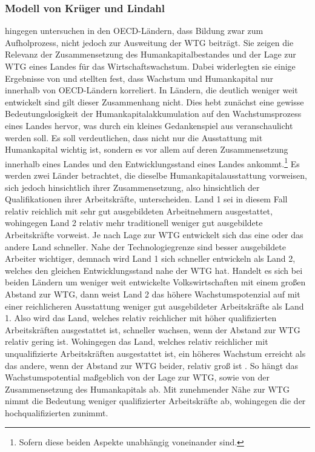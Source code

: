 \subsubsection*{Modell von Krüger und Lindahl}
\cite{Krueger.2001} hingegen untersuchen in den OECD-Ländern, dass Bildung zwar zum Aufholprozess, nicht jedoch zur Ausweitung der WTG beiträgt.
Sie zeigen die Relevanz der Zusammensetzung des Humankapitalbestandes und der Lage zur WTG eines Landes für das Wirtschaftswachstum. Dabei widerlegten sie einige Ergebnisse von \cite{Benhabib.1994} und stellten fest, dass Wachstum und Humankapital nur innerhalb von OECD-Ländern korreliert. In Ländern, die deutlich weniger weit entwickelt sind gilt dieser Zusammenhang nicht. Dies hebt zunächst eine gewisse Bedeutungslosigkeit der Humankapitalakkumulation auf den Wachstumsprozess eines Landes hervor, was durch ein kleines Gedankenspiel aus \cite{Krueger.2001} veranschaulicht werden soll. Es soll verdeutlichen, dass nicht nur die Ausstattung mit Humankapital wichtig ist, sondern es vor allem auf deren Zusammensetzung innerhalb eines Landes und den Entwicklungsstand eines Landes ankommt.\footnote{Sofern diese beiden Aspekte unabhängig voneinander sind.} Es werden zwei Länder betrachtet, die dieselbe Humankapitalausstattung vorweisen, sich jedoch hinsichtlich ihrer Zusammensetzung, also hinsichtlich der Qualifikationen ihrer Arbeitskräfte, unterscheiden. Land 1 sei in diesem Fall relativ reichlich mit sehr gut ausgebildeten Arbeitnehmern ausgestattet, wohingegen Land 2 relativ mehr traditionell weniger gut ausgebildete Arbeitskräfte vorweist. Je nach Lage zur WTG entwickelt sich das eine oder das andere Land schneller. Nahe der Technologiegrenze sind besser ausgebildete Arbeiter wichtiger, demnach wird Land 1 sich schneller entwickeln als Land 2, welches den gleichen Entwicklungsstand nahe der WTG hat. Handelt es sich bei beiden Ländern um weniger weit entwickelte Volkswirtschaften mit einem großen Abstand zur WTG, dann weist Land 2 das höhere Wachstumspotenzial auf mit einer reichlicheren Ausstattung weniger gut ausgebildeter Arbeitskräfte als Land 1. Also wird das Land, welches relativ reichlicher mit höher qualifizierten Arbeitskräften ausgestattet ist, schneller wachsen, wenn der Abstand zur WTG relativ gering ist. Wohingegen das Land, welches relativ reichlicher mit unqualifizierte Arbeitskräften ausgestattet ist, ein höheres Wachstum erreicht als das andere, wenn der Abstand zur WTG beider, relativ groß ist \cite{Krueger.2001}. So hängt das Wachstumspotential maßgeblich von der Lage zur WTG, sowie von der Zusammensetzung des Humankapitals ab. Mit zunehmender Nähe zur WTG nimmt die Bedeutung weniger qualifizierter Arbeitskräfte ab, wohingegen die der hochqualifizierten zunimmt.\\
